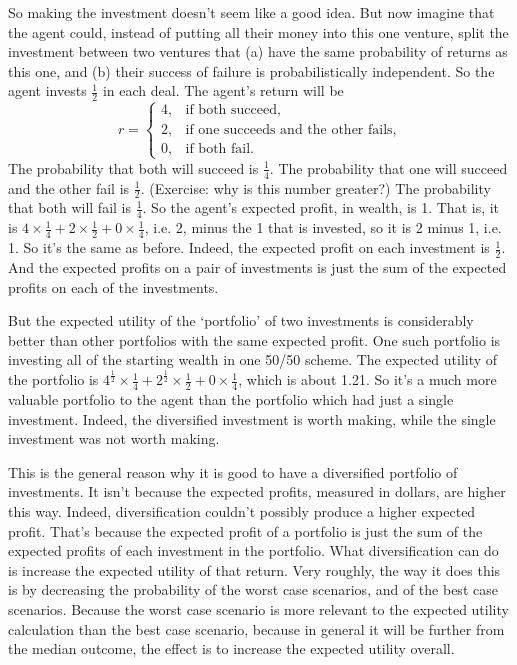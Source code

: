 So making the investment doesn't seem like a good idea. But now imagine that the agent could, instead of putting all their money into this one venture, split the investment between two ventures that (a) have the same probability of returns as this one, and (b) their success of failure is probabilistically independent. So the agent invests $\frac{1}{2}$ in each deal. The agent's return will be
\begin{equation*}
r = \begin{cases}4,& \text{if both succeed} ,\\ 2,& \text{if one succeeds and the other fails},\\ 0,& \text{if both fail} .\end{cases}
\end{equation*}
The probability that both will succeed is $\frac{1}{4}$. The probability that one will succeed and the other fail is $\frac{1}{2}$. (Exercise: why is this number greater?) The probability that both will fail is $\frac{1}{4}$. So the agent's expected profit, in wealth, is 1. That is, it is $4 \times \frac{1}{4} + 2 \times \frac{1}{2} + 0 \times \frac{1}{4}$, i.e. 2, minus the 1 that is invested, so it is 2 minus 1, i.e. 1. So it's the same as before. Indeed, the expected profit on each investment is $\frac{1}{2}$. And the expected profits on a pair of investments is just the sum of the expected profits on each of the investments.

But the expected utility of the `portfolio' of two investments is considerably better than other portfolios with the same expected profit. One such portfolio is investing all of the starting wealth in one 50/50 scheme. The expected utility of the portfolio is $4^{\frac{1}{2}} \times \frac{1}{4} + 2^{\frac{1}{2}} \times \frac{1}{2} + 0 \times \frac{1}{4}$, which is about 1.21. So it's a much more valuable portfolio to the agent than the portfolio which had just a single investment. Indeed, the diversified investment is worth making, while the single investment was not worth making.

This is the general reason why it is good to have a diversified portfolio of investments. It isn't because the expected profits, measured in dollars, are higher this way. Indeed, diversification couldn't possibly produce a higher expected profit. That's because the expected profit of a portfolio is just the sum of the expected profits of each investment in the portfolio. What diversification can do is increase the expected utility of that return. Very roughly, the way it does this is by decreasing the probability of the worst case scenarios, and of the best case scenarios. Because the worst case scenario is more relevant to the expected utility calculation than the best case scenario, because in general it will be further from the median outcome, the effect is to increase the expected utility overall.

